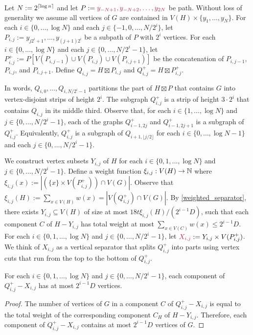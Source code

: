 \documentclass{patmorin}
\makeatletter
\renewcommand{\le}{\leqslant}
\def\mathcolor#1#{\@mathcolor{#1}}
\def\@mathcolor#1#2#3{%
  \protect\leavevmode
  \begingroup
    \color#1{#2}#3%
  \endgroup
}
\newcommand{\mathdefin}[1]{\mathcolor{brightmaroon}{#1}}
\makeatother
\begin{document}
Let $N:=2^{{\lceil \log n \rceil}}$ and let $P:=\mathdefin{y_{-N+1},y_{-N+2},\ldots,y_{2N}}$ be path.  Without loss of generality we assume all vertices of $G$ are contained in $V(H)\times\{y_1,\ldots,y_N\}$.  For each $i\in\{0,\ldots,\log N\}$ and each $j\in\{-1,0,\ldots,N/2^{i}\}$, let $P_{i,j}:=y_{j2^i+1},\ldots,y_{(j+1)2^i}$ be a subpath of $P$ with $2^i$ vertices. For each $i\in\{0,\ldots,\log N\}$ and each $j\in\{0,\ldots,N/2^{i}-1\}$, let $P^+_{i,j}:=P[V(P_{i,j-1})\cup V(P_{i,j})\cup V(P_{i,j+1})]$ be the concatenation of $P_{i,j-1}$, $P_{i,j}$, and $P_{i,j+1}$. Define $Q_{i,j}=H\boxtimes P_{i,j}$ and $Q^+_{i,j}=H\boxtimes P^+_{i,j}$.

In words, $Q_{i,0},\ldots,Q_{i,N/2^i-1}$ partitions the part of $H\boxtimes P$ that contains $G$ into vertex-disjoint strips of height $2^i$. The subgraph $Q^+_{i,j}$ is a strip of height $3\cdot 2^i$ that contains $Q_{i,j}$ in its middle third.  Observe that, for each $i\in\{1,\ldots,\log N\}$ and $j\in\{0,\ldots,N/2^i-1\}$, each of the graphs $Q^+_{i-1,2j}$ and $Q^+_{i-1,2j+1}$ is a subgraph of $Q^+_{i,j}$. Equivalently, $Q^+_{i,j}$ is a subgraph of $Q_{i+1,\lfloor j/2\rfloor}$ for each $i\in\{0,\ldots,\log N-1\}$ and each $j\in\{0,\ldots,N/2^i-1\}$.

We construct vertex subsets $Y_{i,j}$ of $H$ for each $i\in\{0,1,\ldots,\log N\}$ and $j\in\{0,\ldots,N/2^{i}-1\}$.  Define a weight function $\xi_{i,j}:V(H)\to\mathbb{N}$ where $\xi_{i,j}(x):=|(\{x\}\times V(P^+_{i,j})) \cap V(G)|$.  Observe that $\xi_{i,j}(H):=\sum_{x\in V(H)} w(x)=|V(Q^+_{i,j})\cap V(G)|$. By \cref{weighted_separator}, there exists $Y_{i,j}\subseteq V(H)$ of size at most $18t\xi_{i,j}(H)/(2^{i-1}D)$, such that each component $C$ of $H-Y_{i,j}$ has total weight at most $\sum_{x\in V(C)} w(x) \le 2^{i-1}D$.  For each $i\in\{0,1,\ldots,\log N\}$ and $j\in\{0,\ldots,N/2^{i}-1\}$, let $\mathdefin{X_{i,j}}:=Y_{i,j}\times V(P^+_{i,j})$.  We think of $X_{i,j}$ as a vertical separator that splits $Q^+_{i,j}$ into parts using vertex cuts that run from the top to the bottom of $Q^+_{i,j}$.

\begin{lem}
  For each $i\in\{0,1,\ldots,\log N\}$ and $j\in\{0,\ldots,N/2^{i}-1\}$, each component of $Q^+_{i,j}-X_{i,j}$ has at most $2^{i-1}D$ vertices.\
\end{lem}

\begin{proof}
  The number of vertices of $G$ in a component $C$ of $Q^+_{i,j}-X_{i,j}$ is equal to the total weight of the corresponding component $C_H$ of $H-Y_{i,j}$.  Therefore, each component of $Q^+_{i,j}-X_{i,j}$ contains at most $2^{i-1}D$ vertices of $G$.
\end{proof}
\end{document}
